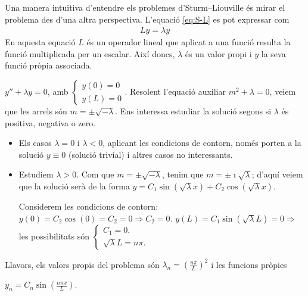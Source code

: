 \begin{defi}
    Una manera intuïtiva d'entendre els problemes d'Sturm--Liouville és mirar el problema des d'una altra perspectiva. L'equació \eqref{eq:S-L} es pot expressar com
    \begin{align}
        Ly = \lambda y
    \end{align}
    En aquesta equació $L$ és un operador lineal que aplicat a una funció resulta la funció multiplicada per un escalar. Així doncs, $\lambda$ és un valor propi i $y$ la seva funció pròpia associada.
\end{defi}

\begin{example}
    $y'' + \lambda y = 0$, amb $\begin{cases} y(0) = 0 \\ y(L) = 0  \end{cases}$. Resolent l'equació auxiliar $m^2 + \lambda = 0$, veiem que les arrels són $m = \pm\sqrt{-\lambda}$. Ens interessa estudiar la solució segons si $\lambda$ és positiva, negativa o zero.
    \begin{itemize}
        \item Els casos $\lambda = 0$ i $\lambda<0$, aplicant les condicions de contorn, només porten a la solució $y\equiv0$ (solució trivial) i altres casos no interessants.
        \item Estudiem $\lambda>0$. Com que $m = \pm\sqrt{-\lambda}$, tenim que $m = \pm \imath \sqrt{\lambda}$; d'aquí veiem que la solució serà de la forma $y =  C_{1} \sin (\sqrt{\lambda} x) + C_{2} \cos (\sqrt{\lambda} x)$.

        Considerem les condicions de contorn:
        \subitem $y(0) = C_{2} \cos (0) = C_{2} = 0 \Rightarrow C_{2} = 0$.
        \subitem $y(L) = C_{1} \sin (\sqrt{\lambda} L) = 0 \Rightarrow$ les possibilitats són $\begin{cases} C_{1} = 0. \\ \sqrt{\lambda} L = n \pi. \end{cases}$
    \end{itemize}
    Llavors, els valors propis del problema són $\boxed{\lambda_{n} = \left( \frac{n\pi}{L} \right)^{2}}$ i les funcions pròpies

    $\boxed{y_{n} = C_{n} \sin \left( \frac{n\pi x}{L} \right)}$.
\end{example}

